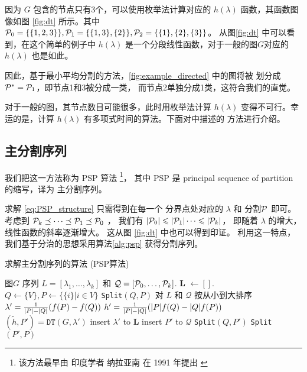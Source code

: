 因为
$G$ 包含的节点只有3个，可以使用枚举法计算对应的 $h(\lambda)$
函数，其函数图像如图 \ref{fig:dt} 所示。其中
$\P_0=\{ \{1,2,3\} \}, \P_1 = \{\{1,3\}, \{2\} \},
\P_2 =\{\{1\},\{2\},\{3\} \}$。
从图\ref{fig:dt} 中可以看到，在这个简单的例子中
$h(\lambda)$
是一个分段线性函数，对于一般的图$G$对应的
$h(\lambda)$ 也是如此。

因此，基于最小平均分割的方法，\ref{fig:example_directed}
中的图将被 划分成 $\P^*=\P_1$，即节点1和3被分成一类，
而节点2单独分成1类，这符合我们的直觉。

对于一般的图，其节点数目可能很多，此时用枚举法计算
$h(\lambda)$ 变得不可行。幸运的是，计算
$h(\lambda)$ 有多项式时间的算法。下面对\cite{mac}中描述的
方法进行介绍。
\subsection{主分割序列}
我们把这一方法称为 PSP 算法
\footnote{该方法最早由
印度学者 纳拉亚南 在 1991 年提出 \cite{narayanan}
}，
其中
PSP 是 principal sequence of partition 的缩写，译为
主分割序列。
    
求解 \eqref{eq:PSP_structure} 只需得到在每一个
分界点处对应的 $\lambda$ 和 分割$\P$ 即可。
考虑到 $\P_k \preceq \dots \preceq \P_1 \preceq \P_0$
，
我们有 $|\P_0| \leq |\P_1| \dots \leq |\P_k|$，
即随着 $\lambda $ 的增大，线性函数的斜率逐渐增大。
这从图 \ref{fig:dt} 中也可以得到印证。
利用这一特点，我们基于分治的思想采用算法\ref{alg:psp}
获得分割序列。

\renewcommand{\algorithmicrequire}{\textbf{输入：}\unskip}
\renewcommand{\algorithmicensure}{\textbf{输出：}\unskip}

\begin{algorithm}
  \caption{求解主分割序列的算法 (PSP算法)}
  \label{alg:psp}
  \small
  \begin{algorithmic}[1]
    \REQUIRE 图$G$
    \ENSURE 序列 $L=[\lambda_1, \dots, \lambda_k]$
    和 $\mathcal{Q}=[\P_0, \dots, \P_k]$.
    \STATE \textbf{L}  $\leftarrow []$.
    \STATE $Q\leftarrow \{V\}, P \leftarrow \{ \{i \} | i \in V\}$
    \STATE \texttt{Split}$(Q,P)$
    \STATE 对 $L$ 和 $\mathcal{Q}$
    按从小到大排序 \footnotemark
     \STATE\label{alg:lambda} $\lambda' =
     {1 \over \abs{P} - \abs{Q}} (f(P)-f(Q))$
     \STATE\label{alg:lambda_plus} $h' = {1 \over \abs{P} - \abs{Q}}(\abs{P} f(Q) - \abs{Q} f(P))$
     \STATE\label{alg:lambda_f} $(\tilde{h}, P') = \texttt{DT}(G,\lambda')$
       \STATE\label{algorithme:terminer} insert $\lambda'$ to $\mathbf{L}$
     \ELSE
       \STATE insert $P'$ to $\mathcal{Q}$
       \STATE\label{algorithme:gauche} \texttt{Split}$(Q, P')$
       \STATE\label{algorithme:droit} \texttt{Split}$(P',P)$
     \ENDIF
    \ENDFUNCTION
  \end{algorithmic}
\end{algorithm}


